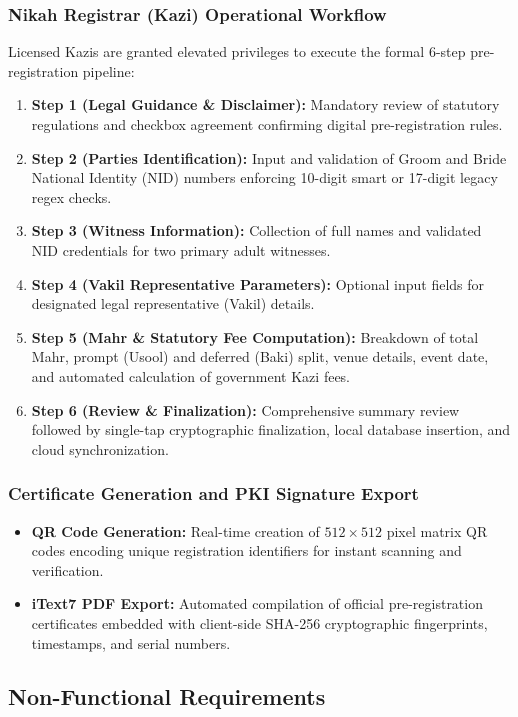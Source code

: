 \documentclass[12pt,a4paper]{article}
\begin{document}
	\subsubsection{Nikah Registrar (Kazi) Operational Workflow}
	Licensed Kazis are granted elevated privileges to execute the formal 6-step pre-registration pipeline:
	\begin{enumerate}
		\item \textbf{Step 1 (Legal Guidance \& Disclaimer):} Mandatory review of statutory regulations and checkbox agreement confirming digital pre-registration rules.
		\item \textbf{Step 2 (Parties Identification):} Input and validation of Groom and Bride National Identity (NID) numbers enforcing 10-digit smart or 17-digit legacy regex checks.
		\item \textbf{Step 3 (Witness Information):} Collection of full names and validated NID credentials for two primary adult witnesses.
		\item \textbf{Step 4 (Vakil Representative Parameters):} Optional input fields for designated legal representative (Vakil) details.
		\item \textbf{Step 5 (Mahr \& Statutory Fee Computation):} Breakdown of total Mahr, prompt (Usool) and deferred (Baki) split, venue details, event date, and automated calculation of government Kazi fees.
		\item \textbf{Step 6 (Review \& Finalization):} Comprehensive summary review followed by single-tap cryptographic finalization, local database insertion, and cloud synchronization.
	\end{enumerate}
	
	\subsubsection{Certificate Generation and PKI Signature Export}
	\begin{itemize}
		\item \textbf{QR Code Generation:} Real-time creation of $512\times512$ pixel matrix QR codes encoding unique registration identifiers for instant scanning and verification.
		\item \textbf{iText7 PDF Export:} Automated compilation of official pre-registration certificates embedded with client-side SHA-256 cryptographic fingerprints, timestamps, and serial numbers.
	\end{itemize}
	
	\subsection{Non-Functional Requirements}
	
\end{document}
